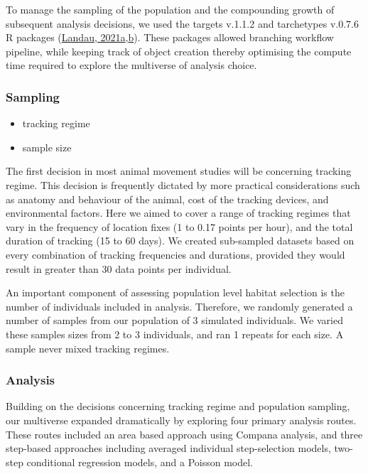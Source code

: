 \documentclass[10pt,a4paper]{article}
\begin{document}
To manage the sampling of the population and the compounding growth of subsequent analysis decisions, we used the targets v.1.1.2 and tarchetypes v.0.7.6 R packages (\protect\hyperlink{ref-targets}{Landau, 2021a},\protect\hyperlink{ref-tarchetypes}{b}).
These packages allowed branching workflow pipeline, while keeping track of object creation thereby optimising the compute time required to explore the multiverse of analysis choice.

\hypertarget{sampling}{%
\subsubsection{Sampling}\label{sampling}}

\begin{itemize}
\item
  tracking regime
\item
  sample size
\end{itemize}

The first decision in most animal movement studies will be concerning tracking regime.
This decision is frequently dictated by more practical considerations such as anatomy and behaviour of the animal, cost of the tracking devices, and environmental factors.
Here we aimed to cover a range of tracking regimes that vary in the frequency of location fixes (1 to 0.17 points per hour), and the total duration of tracking (15 to 60 days).
We created sub-sampled datasets based on every combination of tracking frequencies and durations, provided they would result in greater than 30 data points per individual.

An important component of assessing population level habitat selection is the number of individuals included in analysis.
Therefore, we randomly generated a number of samples from our population of 3 simulated individuals.
We varied these samples sizes from 2 to 3 individuals, and ran 1 repeats for each size.
A sample never mixed tracking regimes.

\hypertarget{analysis}{%
\subsubsection{Analysis}\label{analysis}}

Building on the decisions concerning tracking regime and population sampling, our multiverse expanded dramatically by exploring four primary analysis routes.
These routes included an area based approach using Compana analysis, and three step-based approaches including averaged individual step-selection models, two-step conditional regression models, and a Poisson model.
\end{document}
